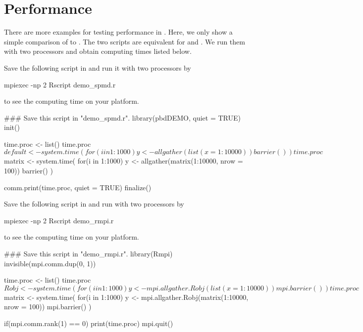
\section[Performance]{Performance}
\label{sec:performance}

There are more examples for testing performance in
. Here, we only show a simple
comparison of  to .  The two scripts are
equivalent for  and .  We run them with two
processors and obtain computing times listed below.

Save the following script in  and run it with two
processors by
\begin{Command}
mpiexec -np 2 Rscript demo_spmd.r
\end{Command}
to see the computing time on your platform.

\begin{Code}[title=\pkg{pbdDEMO} R Script]
### Save this script in "demo_spmd.r".
library(pbdDEMO, quiet = TRUE)
init()

time.proc <- list()
time.proc$default <- system.time({
  for(i in 1:1000) y <- allgather(list(x = 1:10000))
  barrier()
})

time.proc$matrix <- system.time({
  for(i in 1:1000) y <- allgather(matrix(1:10000, nrow = 100))
  barrier()
})

comm.print(time.proc, quiet = TRUE)
finalize()
\end{Code}

Save the following script in  and run with two processors by
\begin{Command}
mpiexec -np 2 Rscript demo_rmpi.r
\end{Command}
to see the computing time on your platform.

\begin{Code}[title=\pkg{Rmpi} R Script]
### Save this script in "demo_rmpi.r".
library(Rmpi)
invisible(mpi.comm.dup(0, 1))

time.proc <- list()
time.proc$Robj <- system.time({
  for(i in 1:1000) y <- mpi.allgather.Robj(list(x = 1:10000))
  mpi.barrier()
})

time.proc$matrix <- system.time({
  for(i in 1:1000) y <- mpi.allgather.Robj(matrix(1:10000, nrow = 100))
  mpi.barrier()
})

if(mpi.comm.rank(1) == 0) print(time.proc)
mpi.quit()
\end{Code}

